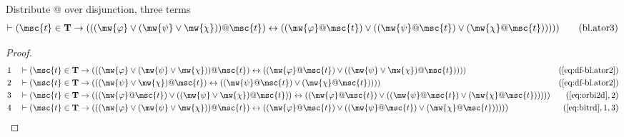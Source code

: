 \begin{lemma} {Distribute @ over disjunction, three terms}
\begin{align}
\vdash ( \msc{t} \in \mathbf{T} \rightarrow ( ( ( \mw{\varphi} \vee ( \mw{\psi}
    \vee \mw{\chi} ) ) @ \msc{t} ) \leftrightarrow ( ( \mw{\varphi} @ \msc{t} )
    \vee ( ( \mw{\psi} @ \msc{t} ) \vee ( \mw{\chi} @ \msc{t} ) ) ) )
    )\label{eq:bl.ator3}\tag{bl.ator3}
\end{align}
\end{lemma}


\begin{proof}
\begin{align}
  1 &&  & \vdash ( \msc{t} \in \mathbf{T} \rightarrow ( ( ( \mw{\varphi} \vee (
     \mw{\psi} \vee \mw{\chi} ) ) @ \msc{t} )
     \leftrightarrow ( ( \mw{\varphi} @ \msc{t} ) \vee ( (
     \mw{\psi} \vee \mw{\chi} ) @ \msc{t} ) ) )
     )&(\mbox{\ref{eq:df-bl.ator2}})\notag
  \\ 2 &&  & \vdash ( \msc{t} \in \mathbf{T} \rightarrow ( ( ( \mw{\psi} \vee
     \mw{\chi} ) @ \msc{t} ) \leftrightarrow ( ( \mw{\psi}
     @ \msc{t} ) \vee ( \mw{\chi} @ \msc{t} ) ) )
     )&(\mbox{\ref{eq:df-bl.ator2}})\notag
  \\ 3 &&  & \vdash ( \msc{t} \in \mathbf{T} \rightarrow ( ( ( \mw{\varphi} @
     \msc{t} ) \vee ( ( \mw{\psi} \vee \mw{\chi} ) @
     \msc{t} ) ) \leftrightarrow ( ( \mw{\varphi} @
     \msc{t} ) \vee ( ( \mw{\psi} @ \msc{t} ) \vee (
     \mw{\chi} @ \msc{t} ) ) ) )
     )&(\mbox{\ref{eq:orbi2d}},2)\notag
  \\ 4 &&  & \vdash ( \msc{t} \in \mathbf{T} \rightarrow ( ( ( \mw{\varphi}
     \vee ( \mw{\psi} \vee \mw{\chi} ) ) @ \msc{t} )
     \leftrightarrow ( ( \mw{\varphi} @ \msc{t} ) \vee ( (
     \mw{\psi} @ \msc{t} ) \vee ( \mw{\chi} @ \msc{t} ) )
     ) ) )&(\mbox{\ref{eq:bitrd}},1,3)\notag
\end{align}
\end{proof}


